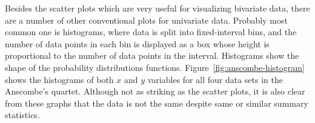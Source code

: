 Besides the scatter plots
which are very useful for visualizing bivariate data,
there are a number of other conventional plots for univariate data.
Probably most common one is histograms,
where data is split into fixed-interval bins,
and the number of data points in each bin is displayed as
a box whose height is proportional to the number of data points
in the interval.
Histograms show the shape of the probability distributions functions.
Figure~\ref{fig:anscombe-histogram} shows the histograms of both $x$ and $y$
variables for all four data sets in the Anscombe's quartet.
Although not as striking as the scatter plots,
it is also clear from these graphs
that the data is not the same despite same or similar summary statistics.

\begin{marginfigure}
\end{marginfigure}
